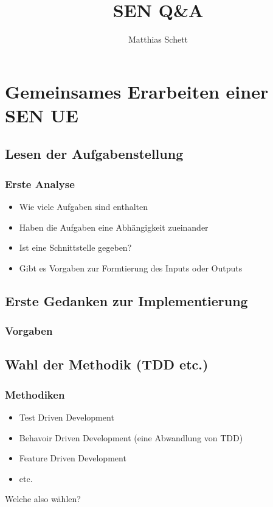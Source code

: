 \documentclass{beamer}
\title{SEN Q\&A}
\author{Matthias Schett}
\begin{document}
\lstset{language=C++, showstringspaces=false, breaklines=true, numbers=left, frame=single} 


\maketitle
\frame{\tableofcontents[hideallsubsections]}

\section{Gemeinsames Erarbeiten einer SEN UE}
\subsection{Lesen der Aufgabenstellung}
\begin{frame}[<+->][Label=analyse]
	\frametitle{Erste Analyse}
	\pause
	\begin{itemize}
		\item Wie viele Aufgaben sind enthalten
		\item Haben die Aufgaben eine Abhängigkeit zueinander
		\item Ist eine Schnittstelle gegeben?
		\item Gibt es Vorgaben zur Formtierung des Inputs oder Outputs
	\end{itemize}
\end{frame}

\subsection{Erste Gedanken zur Implementierung}
\begin{frame}[<+->]\frametitle{Vorgaben}
\pause
\end{frame}

\subsection{Wahl der Methodik (TDD etc.)}
\begin{frame}[<+->]\frametitle{Methodiken}
\pause
    \begin{itemize}
    	\item Test Driven Development
    	\item Behavoir Driven Development (eine Abwandlung von TDD)
    	\item Feature Driven Development
    	\item etc.
    \end{itemize}
    \pause
    Welche also wählen?
\end{frame}
\end{document}
